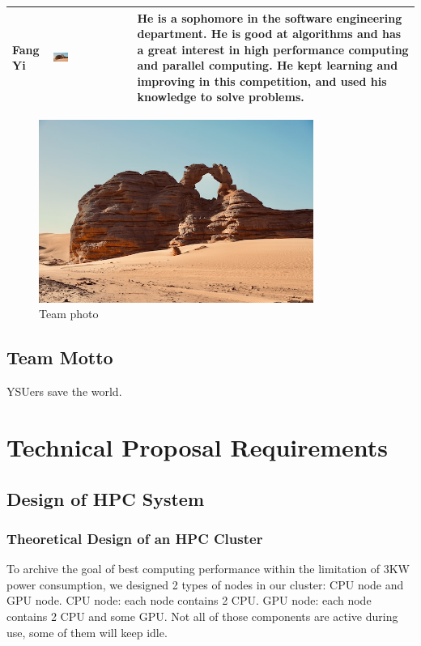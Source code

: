 \documentclass[a4paper,12pt]{article}
\begin{document}
\begin{table}[H]
\begin{tabular}{|l|l|l|}
\hline
Fang Yi & \includegraphics[width=0.2\textwidth]{Fang_Yi.png} & He is a sophomore in the software engineering department. He is good at algorithms and has a great interest in high performance computing and parallel computing. He kept learning and improving in this competition, and used his knowledge to solve problems. \\
\hline
\end{tabular}
\end{table}
\begin{figure}[H]
    \centering
    \includegraphics[width=0.8\textwidth]{Team_Photo.png}
    \caption{Team photo}
    \label{fig:team_photo}
\end{figure}


\subsection{Team Motto}
YSUers save the world.

\newpage

\section{Technical Proposal Requirements}

\subsection{Design of HPC System}

\subsubsection{Theoretical Design of an HPC Cluster}
To archive the goal of best computing performance within the limitation of 3KW power consumption, we designed 2 types of nodes in our cluster: CPU node and GPU node.
CPU node: each node contains 2 CPU.
GPU node: each node contains 2 CPU and some GPU.
Not all of those components are active during use, some of them will keep idle.
\end{document}
